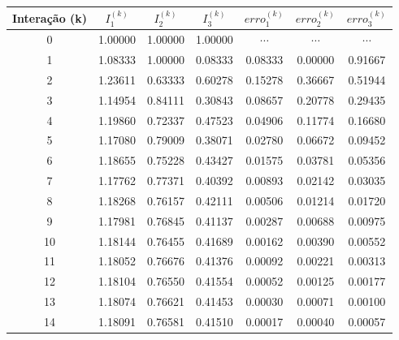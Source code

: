 \documentclass[a4paper,11pt, twoside]{article}
\newcommand{\n}[1]{\textbf{#1}}
\begin{document}
    {\linespread{1}
    \begin{table}[!th]
        \begin{center}
            \begin{tabular}{ c c c c c c c }
                \toprule[0.11em]
                \n{Interação (k)} & \n{$I_1^{(k)}$} & \n{$I_2^{(k)}$} & \n{$I_3^{(k)}$} & \n{$erro_1^{(k)}$} & \n{$erro_2^{(k)}$} & \n{$erro_3^{(k)}$}\\
                \toprule[0.11em]
                0 & 1.00000 & 1.00000 & 1.00000 & $\cdots$  & $\cdots$  & $\cdots$ \\
                \midrule
                1 & 1.08333 & 1.00000 & 0.08333 & 0.08333  & 0.00000  & 0.91667 \\
                \midrule
                2 & 1.23611 & 0.63333 & 0.60278 & 0.15278  & 0.36667  & 0.51944 \\
                \midrule
                3 & 1.14954 & 0.84111 & 0.30843 & 0.08657  & 0.20778  & 0.29435 \\
                \midrule
                4 & 1.19860 & 0.72337 & 0.47523 & 0.04906  & 0.11774  & 0.16680 \\
                \midrule
                5 & 1.17080 & 0.79009 & 0.38071 & 0.02780  & 0.06672  & 0.09452 \\
                \midrule
                6 & 1.18655 & 0.75228 & 0.43427 & 0.01575  & 0.03781  & 0.05356 \\
                \midrule
                7 & 1.17762 & 0.77371 & 0.40392 & 0.00893  & 0.02142  & 0.03035 \\
                \midrule
                8 & 1.18268 & 0.76157 & 0.42111 & 0.00506  & 0.01214  & 0.01720 \\
                \midrule
                9 & 1.17981 & 0.76845 & 0.41137 & 0.00287  & 0.00688  & 0.00975 \\
                \midrule
                10 & 1.18144 & 0.76455 & 0.41689 & 0.00162  & 0.00390  & 0.00552 \\
                \midrule
                11 & 1.18052 & 0.76676 & 0.41376 & 0.00092  & 0.00221  & 0.00313 \\
                \midrule
                12 & 1.18104 & 0.76550 & 0.41554 & 0.00052  & 0.00125  & 0.00177 \\
                \midrule
                13 & 1.18074 & 0.76621 & 0.41453 & 0.00030  & 0.00071  & 0.00100 \\
                \midrule
                14 & 1.18091 & 0.76581 & 0.41510 & 0.00017  & 0.00040  & 0.00057 \\

\end{tabular}
\end{center}
\end{table}}
\end{document}
